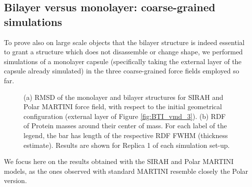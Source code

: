 \subsection{Bilayer versus monolayer: coarse-grained simulations}
To prove also on large scale objects that the bilayer structure is indeed essential to grant a structure which does not disassemble or change shape, we performed simulations of a monolayer capsule (specifically taking the external layer of the capsule already simulated) in the three coarse-grained force fields employed so far.
%
\begin{figure}[h!]
    \caption[Comparison of monolayer and bilayer structural properties]{(a) RMSD of the monolayer and bilayer structures for SIRAH and Polar MARTINI force field, with respect to the initial geometrical configuration (external layer of Figure \ref{fig:BTI_vmd_3}). (b) RDF of Protein masses around their center of mass. For each label of the legend, the bar has length of the respective RDF FWHM (thickness estimate). Results are shown for Replica 1 of each simulation set-up.}
\label{fig:mono_bi}
\end{figure}
We focus here on the results obtained with the SIRAH and Polar MARTINI models, as the ones observed with standard MARTINI resemble closely the Polar version.

